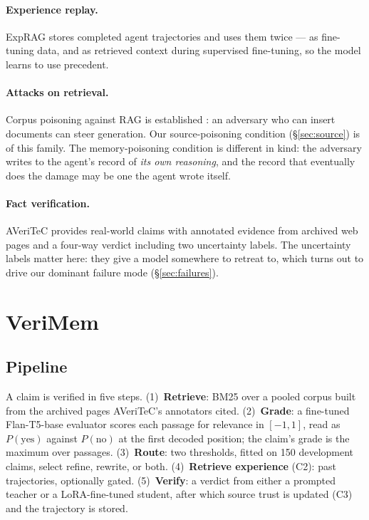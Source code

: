 \documentclass[11pt]{article}
\begin{document}
\paragraph{Experience replay.} ExpRAG \citep{ferraz2026exprag} stores completed
agent trajectories and uses them twice --- as fine-tuning data, and as retrieved
context during supervised fine-tuning, so the model learns to use precedent.

\paragraph{Attacks on retrieval.} Corpus poisoning against RAG is established
\citep{zou2024poisonedrag, zhong2023poisoning}: an adversary who can insert
documents can steer generation. Our source-poisoning condition (\S\ref{sec:source})
is of this family. The memory-poisoning condition is different in kind: the
adversary writes to the agent's record of \emph{its own reasoning}, and the
record that eventually does the damage may be one the agent wrote itself.

\paragraph{Fact verification.} AVeriTeC \citep{schlichtkrull2023averitec}
provides real-world claims with annotated evidence from archived web pages and a
four-way verdict including two uncertainty labels. The uncertainty labels matter
here: they give a model somewhere to retreat to, which turns out to drive our
dominant failure mode (\S\ref{sec:failures}).

\section{VeriMem}

\subsection{Pipeline}

A claim is verified in five steps. (1)~\textbf{Retrieve}: BM25 over a pooled
corpus built from the archived pages AVeriTeC's annotators cited. (2)~\textbf{Grade}:
a fine-tuned Flan-T5-base evaluator scores each passage for relevance in
$[-1,1]$, read as $P(\text{yes})$ against $P(\text{no})$ at the first decoded
position; the claim's grade is the maximum over passages. (3)~\textbf{Route}:
two thresholds, fitted on 150 development claims, select refine, rewrite, or
both. (4)~\textbf{Retrieve experience} (C2): past trajectories, optionally
gated. (5)~\textbf{Verify}: a verdict from either a prompted teacher or a
LoRA-fine-tuned student, after which source trust is updated (C3) and the
trajectory is stored.
\end{document}
